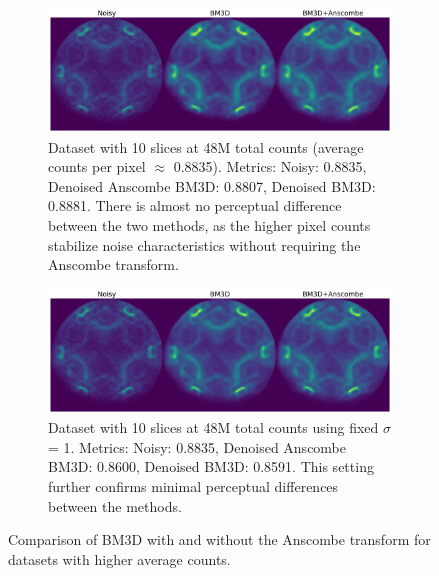 \begin{figure}
    \centering
    \begin{subfigure}[b]{1\linewidth}
        \centering
        \includegraphics[width=1\linewidth]{images/noisy_denoised_bm3d_anscombe_48M_10slices_sigma_1.pdf}
        \caption{Dataset with 10 slices at 48M total counts (average counts per pixel $\approx$ 0.8835). Metrics: Noisy: 0.8835, Denoised Anscombe BM3D: 0.8807, Denoised BM3D: 0.8881. There is almost no perceptual difference between the two methods, as the higher pixel counts stabilize noise characteristics without requiring the Anscombe transform.}
        \label{}
    \end{subfigure}
    \begin{subfigure}[b]{1\linewidth}
        \centering
        \includegraphics[width=1\linewidth]{images/noisy_denoised_bm3d_anscombe_48M_10slices_optimal_sigma.pdf}
        \caption{Dataset with 10 slices at 48M total counts using fixed $\sigma$ = 1. Metrics: Noisy: 0.8835, Denoised Anscombe BM3D: 0.8600, Denoised BM3D: 0.8591. This setting further confirms minimal perceptual differences between the methods.}
    \end{subfigure}
    \caption{Comparison of BM3D with and without the Anscombe transform for datasets with higher average counts.}
    \label{}
\end{figure}

